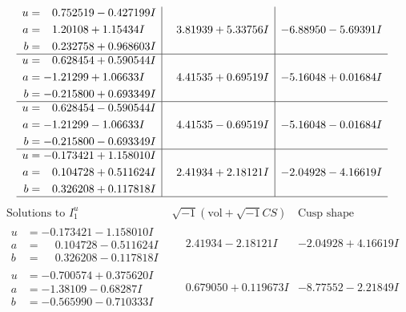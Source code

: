 \documentclass[1p]{elsarticle_modified}
\theoremstyle{definition}
\newcommand{\I}{\sqrt{-1}}
\begin{document}
$$\begin{array}{c|c|c}
\begin{aligned}
u &= \phantom{-}0.752519 - 0.427199 I \\
a &= \phantom{-}1.20108 + 1.15434 I \\
b &= \phantom{-}0.232758 + 0.968603 I\end{aligned}
 & \phantom{-}3.81939 + 5.33756 I & -6.88950 - 5.69391 I \\ \hline\begin{aligned}
u &= \phantom{-}0.628454 + 0.590544 I \\
a &= -1.21299 + 1.06633 I \\
b &= -0.215800 + 0.693349 I\end{aligned}
 & \phantom{-}4.41535 + 0.69519 I & -5.16048 + 0.01684 I \\ \hline\begin{aligned}
u &= \phantom{-}0.628454 - 0.590544 I \\
a &= -1.21299 - 1.06633 I \\
b &= -0.215800 - 0.693349 I\end{aligned}
 & \phantom{-}4.41535 - 0.69519 I & -5.16048 - 0.01684 I \\ \hline\begin{aligned}
u &= -0.173421 + 1.158010 I \\
a &= \phantom{-}0.104728 + 0.511624 I \\
b &= \phantom{-}0.326208 + 0.117818 I\end{aligned}
 & \phantom{-}2.41934 + 2.18121 I & -2.04928 - 4.16619 I\\
 \hline 
 \end{array}$$\newpage$$\begin{array}{c|c|c}  
\text{Solutions to }I^u_{1}& \I (\text{vol} + \sqrt{-1}CS) & \text{Cusp shape}\\
 \hline 
\begin{aligned}
u &= -0.173421 - 1.158010 I \\
a &= \phantom{-}0.104728 - 0.511624 I \\
b &= \phantom{-}0.326208 - 0.117818 I\end{aligned}
 & \phantom{-}2.41934 - 2.18121 I & -2.04928 + 4.16619 I \\ \hline\begin{aligned}
u &= -0.700574 + 0.375620 I \\
a &= -1.38109 - 0.68287 I \\
b &= -0.565990 - 0.710333 I\end{aligned}
 & \phantom{-}0.679050 + 0.119673 I & -8.77552 - 2.21849 I \\ \hline\begin{aligned}

\end{aligned}
\end{array}$$
\end{document}
